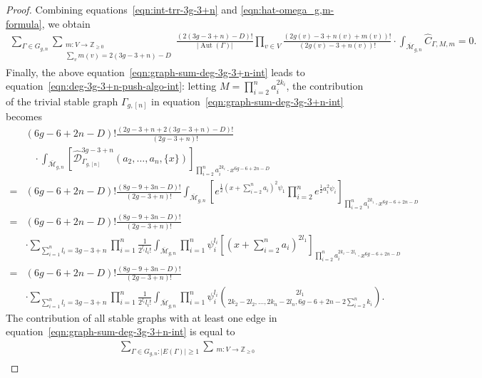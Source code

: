 \documentclass[12pt,reqno]{amsart}
\DeclareMathOperator{\Aut}{Aut}
\theoremstyle{plain}
\theoremstyle{definition}
\theoremstyle{remark}
\begin{document}
\begin{proof}
Combining equations~\eqref{eqn:int-trr-3g-3+n} and \eqref{eqn:hat-omega_g,m-formula}, we obtain
\begin{align}\label{eqn:graph-sum-deg-3g-3+n-int}
\sum_{\Gamma\in G_{g,n}} \sum_{\substack{m\colon V \to \mathbb Z_{\ge 0} \\ \sum_v m(v) = 2(3g-3+n)-D}}
    \frac{(2(3g-3+n)-D)!}{|\Aut(\Gamma)|}
    \prod_{v \in V} \frac{(2g(v) - 3 + n(v) + m(v))!}{(2g(v) - 3 + n(v))!} \cdot \int_{\overline{\mathcal{M}}_{g,n}}\widehat{C}_{\Gamma, M, m}=0.
  \end{align}
  Finally, the above equation~\eqref{eqn:graph-sum-deg-3g-3+n-int} leads to equation~\eqref{eqn:deg-3g-3+n-push-algo-int}: letting $M=\prod_{i=2}^{n}a_i^{2k_i}$,
  the contribution of the trivial stable graph $\Gamma_{g,[n]}$ in equation~\eqref{eqn:graph-sum-deg-3g-3+n-int} becomes
  \begin{align}\label{eqn:contr-trivial-inter-number}
  &(6g-6+2n-D)!\frac{(2g-3+n+2(3g-3+n)-D)!}{(2g-3+n)!} 
\nonumber\\&\hspace{10pt}\cdot\int_{\overline{\mathcal{M}}_{g,n}}\left[\widehat{\mathcal{D}}_{\Gamma_{g,[n]}}^{3g-3+n}(a_2,\dots,a_n,\{x\})\right]_{\prod_{i=2}^{n}a_i^{2k_i}\cdot x^{6g-6+2n-D}}
\nonumber\\=&(6g-6+2n-D)!\frac{(8g-9+3n-D)!}{(2g-3+n)!} 
\int_{\overline{\mathcal{M}}_{g,n}}\left[e^{\frac{1}{2}(x+\sum_{i=2}^{n}a_i)^2\psi_1}\prod_{i=2}^{n}e^{\frac{1}{2}a_i^2\psi_i}\right]_{\prod_{i=2}^{n}a_i^{2k_i}\cdot x^{6g-6+2n-D}}
\nonumber\\=&(6g-6+2n-D)!\frac{(8g-9+3n-D)!}{(2g-3+n)!} 
\nonumber\\&\cdot
\sum_{\sum_{i=1}^{n}l_i=3g-3+n}\prod_{i=1}^{n}\frac{1}{2^{l_i}l_i!}
\int_{\overline{\mathcal{M}}_{g,n}}\prod_{i=1}^{n}\psi_i^{l_i}\left[(x+\sum_{i=2}^{n}a_i)^{2l_1}\right]_{\prod_{i=2}^{n}a_i^{2k_i-2l_i}\cdot x^{6g-6+2n-D}}
\nonumber\\=&(6g-6+2n-D)!\frac{(8g-9+3n-D)!}{(2g-3+n)!} 
\nonumber\\&\cdot
\sum_{\sum_{i=1}^{n}l_i=3g-3+n}\prod_{i=1}^{n}\frac{1}{2^{l_i}l_i!}
\int_{\overline{\mathcal{M}}_{g,n}}\prod_{i=1}^{n}\psi_i^{l_i}
\binom{2l_1}{2k_2-2l_2,\dots,2k_n-2l_n,6g-6+2n-2\sum_{i=2}^{n}k_i}.
  \end{align}
The contribution of all stable graphs with at least one edge in equation~\eqref{eqn:graph-sum-deg-3g-3+n-int} is equal to 
\begin{align}\label{eqn:contr-other-graph-inter-number}
&\sum_{\Gamma\in G_{g,n}: |E(\Gamma)|\geq1}\sum_{\substack{m:V\rightarrow\mathbb{Z}_{\geq0}\\
}}
\end{align}
\end{proof}
\end{document}
